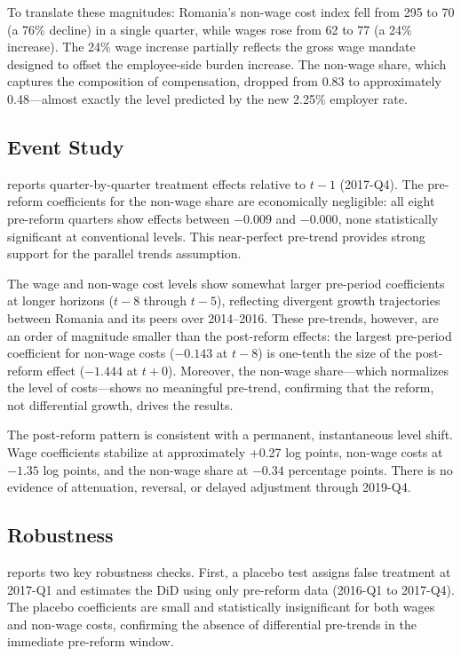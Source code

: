 \documentclass[12pt]{article}
\begin{document}
To translate these magnitudes: Romania's non-wage cost index fell from 295 to 70 (a 76\% decline) in a single quarter, while wages rose from 62 to 77 (a 24\% increase). The 24\% wage increase partially reflects the gross wage mandate designed to offset the employee-side burden increase. The non-wage share, which captures the composition of compensation, dropped from 0.83 to approximately 0.48---almost exactly the level predicted by the new 2.25\% employer rate.




\subsection{Event Study}

 reports quarter-by-quarter treatment effects relative to $t-1$ (2017-Q4). The pre-reform coefficients for the non-wage share are economically negligible: all eight pre-reform quarters show effects between $-0.009$ and $-0.000$, none statistically significant at conventional levels. This near-perfect pre-trend provides strong support for the parallel trends assumption.

The wage and non-wage cost levels show somewhat larger pre-period coefficients at longer horizons ($t-8$ through $t-5$), reflecting divergent growth trajectories between Romania and its peers over 2014--2016. These pre-trends, however, are an order of magnitude smaller than the post-reform effects: the largest pre-period coefficient for non-wage costs ($-0.143$ at $t-8$) is one-tenth the size of the post-reform effect ($-1.444$ at $t+0$). Moreover, the non-wage share---which normalizes the level of costs---shows no meaningful pre-trend, confirming that the reform, not differential growth, drives the results.

The post-reform pattern is consistent with a permanent, instantaneous level shift. Wage coefficients stabilize at approximately +0.27 log points, non-wage costs at $-1.35$ log points, and the non-wage share at $-0.34$ percentage points. There is no evidence of attenuation, reversal, or delayed adjustment through 2019-Q4.




\subsection{Robustness}

 reports two key robustness checks. First, a placebo test assigns false treatment at 2017-Q1 and estimates the DiD using only pre-reform data (2016-Q1 to 2017-Q4). The placebo coefficients are small and statistically insignificant for both wages and non-wage costs, confirming the absence of differential pre-trends in the immediate pre-reform window.
\end{document}
